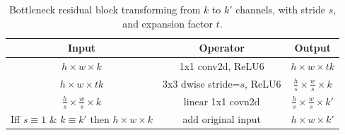 \documentclass[12pt]{article}
\numberwithin{equation}{section}
\numberwithin{figure}{section}
\begin{document}
\begin{table}[]
	\centering
	\begin{tabular}{c|c|c}
	\hline
	\textbf{Input}                            & \textbf{Operator}           & \textbf{Output}                            \\ \hline \hline
	$h \times w \times k$                     & 1x1 conv2d, ReLU6           & $h \times w \times tk$                     \\
	$h \times w \times tk$                    & 3x3 dwise stride=$s$, ReLU6 & $\frac{h}{s} \times \frac{w}{s} \times k$  \\
	$\frac{h}{s} \times \frac{w}{s} \times k$ & linear 1x1 covn2d           & $\frac{h}{s} \times \frac{w}{s} \times k'$ \\ \hline
	Iff $s \equiv 1$ \& $k \equiv k'$ then $h \times w \times k$ & add original input           & $h \times w \times k'$ \\ \hline
	\end{tabular}
	\caption{Bottleneck residual block transforming from $k$ to $k'$ channels, with stride $s$, and expansion factor $t$.
	}
	\label{tab:bottleneck}
	\end{table}
\end{document}
